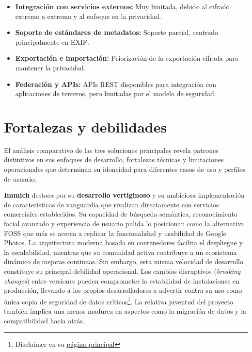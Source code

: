 \begin{itemize}
    \item \textbf{Integración con servicios externos:} Muy limitada, debido al cifrado extremo a extremo y al enfoque en la privacidad.
    \item \textbf{Soporte de estándares de metadatos:} Soporte parcial, centrado principalmente en EXIF.
    \item \textbf{Exportación e importación:} Priorización de la exportación cifrada para mantener la privacidad.
    \item \textbf{Federación y APIs:} APIs REST disponibles para integración con aplicaciones de terceros, pero limitadas por el modelo de seguridad.
\end{itemize}

\section{Fortalezas y debilidades}
El análisis comparativo de las tres soluciones principales revela patrones distintivos en sus enfoques de desarrollo, fortalezas técnicas y limitaciones operacionales que determinan su idoneidad para diferentes casos de uso y perfiles de usuario.

\textbf{Immich} destaca por su \textbf{desarrollo vertiginoso} y su ambiciosa implementación de características de vanguardia que rivalizan directamente con servicios comerciales establecidos. Su capacidad de búsqueda semántica, reconocimiento facial avanzado y experiencia de usuario pulida lo posicionan como la alternativa FOSS que más se acerca a replicar la funcionalidad y usabilidad de Google Photos. La arquitectura moderna basada en contenedores facilita el despliegue y la escalabilidad, mientras que su comunidad activa contribuye a un ecosistema dinámico de mejoras continuas. Sin embargo, esta misma velocidad de desarrollo constituye su principal debilidad operacional. Los cambios disruptivos (\textit{breaking changes}) entre versiones pueden comprometer la estabilidad de instalaciones en producción, llevando a los propios desarrolladores a advertir contra su uso como única copia de seguridad de datos críticos\footnote{Disclaimer en su \href{https://immich.app/}{página principal}}. La relativa juventud del proyecto también implica una menor madurez en aspectos como la migración de datos y la compatibilidad hacia atrás.

